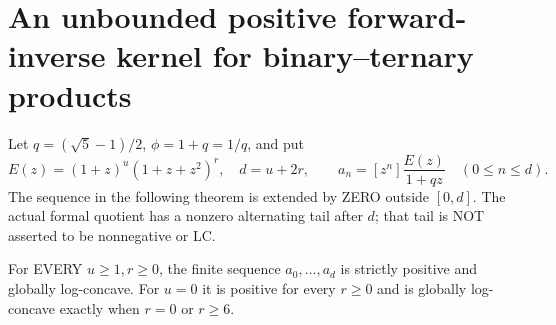 \section{An unbounded positive forward-inverse kernel for binary--ternary products}
Let $q=(\sqrt5-1)/2$, $\phi=1+q=1/q$, and put
\[
 E(z)=(1+z)^u(1+z+z^2)^r,\quad d=u+2r,\qquad
 a_n=[z^n]\frac{E(z)}{1+qz}\quad(0\le n\le d).
\]
The sequence in the following theorem is extended by ZERO outside
$[0,d]$. The actual formal quotient has a nonzero alternating tail
after $d$; that tail is NOT asserted to be nonnegative or LC.

\begin{theorem}
For EVERY $u\ge1,r\ge0$, the finite sequence $a_0,\ldots,a_d$
is strictly positive and globally log-concave. For $u=0$ it is
positive for every $r\ge0$ and is globally log-concave exactly when
$r=0$ or $r\ge6$.
\end{theorem}

